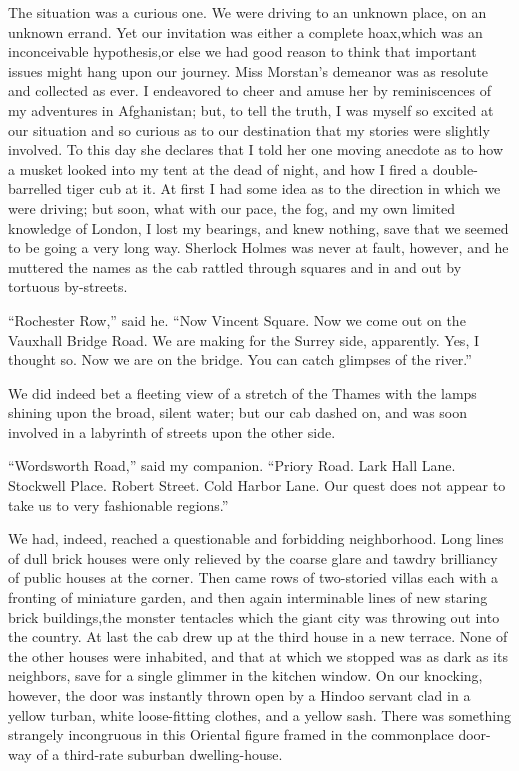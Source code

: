 \documentclass[12pt,english,oneside]{book}
\begin{document}
The situation was a curious one. We were driving to an unknown place,
on an unknown errand. Yet our invitation was either a complete hoax,\mdsh{---}which
was an inconceivable hypothesis,\mdsh{---}or else we had good reason
to think that important issues might hang upon our journey. Miss Morstan's
demeanor was as resolute and collected as ever. I endeavored to cheer
and amuse her by reminiscences of my adventures in Afghanistan; but,
to tell the truth, I was myself so excited at our situation and so
curious as to our destination that my stories were slightly involved.
To this day she declares that I told her one moving anecdote as to
how a musket looked into my tent at the dead of night, and how I fired
a double-barrelled tiger cub at it. At first I had some idea as to
the direction in which we were driving; but soon, what with our pace,
the fog, and my own limited knowledge of London, I lost my bearings,
and knew nothing, save that we seemed to be going a very long way.
Sherlock Holmes was never at fault, however, and he muttered the names
as the cab rattled through squares and in and out by tortuous by-streets.

{}``Rochester Row,'' said he. {}``Now Vincent Square. Now we come
out on the Vauxhall Bridge Road. We are making for the Surrey side,
apparently. Yes, I thought so. Now we are on the bridge. You can catch
glimpses of the river.''

We did indeed bet a fleeting view of a stretch of the Thames with
the lamps shining upon the broad, silent water; but our cab dashed
on, and was soon involved in a labyrinth of streets upon the other
side.

{}``Wordsworth Road,'' said my companion. {}``Priory Road. Lark
Hall Lane. Stockwell Place. Robert Street. Cold Harbor Lane. Our quest
does not appear to take us to very fashionable regions.''

We had, indeed, reached a questionable and forbidding neighborhood.
Long lines of dull brick houses were only relieved by the coarse glare
and tawdry brilliancy of public houses at the corner. Then came rows
of two-storied villas each with a fronting of miniature garden, and
then again interminable lines of new staring brick buildings,\mdsh{---}the
monster tentacles which the giant city was throwing out into the country.
At last the cab drew up at the third house in a new terrace. None
of the other houses were inhabited, and that at which we stopped was
as dark as its neighbors, save for a single glimmer in the kitchen
window. On our knocking, however, the door was instantly thrown open
by a Hindoo servant clad in a yellow turban, white loose-fitting clothes,
and a yellow sash. There was something strangely incongruous in this
Oriental figure framed in the commonplace door-way of a third-rate
suburban dwelling-house.
\end{document}
